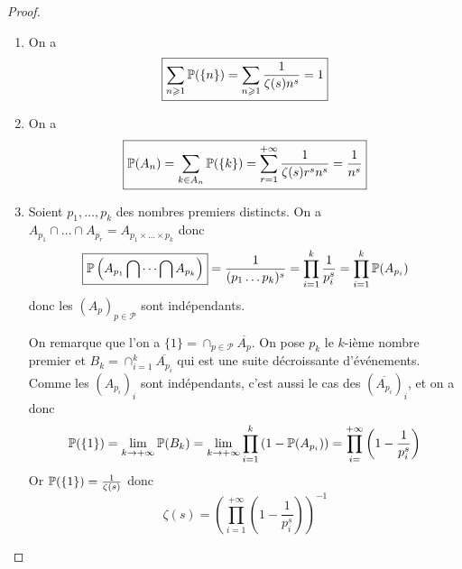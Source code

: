 \documentclass[12pt]{article}
\begin{document}
\begin{proof}
    \phantom{}
    \begin{enumerate}
        \item On a 
        \begin{equation}
            \boxed{\sum_{n\geqslant1}\P(\lbrace n\rbrace)=\sum_{n\geqslant1}\frac{1}{\zeta(s)n^{s}}=1}
        \end{equation}

        \item On a 
        \begin{equation}
            \boxed{\P(A_{n})=\sum_{k\in A_{n}}\P(\lbrace k\rbrace)=\sum_{r=1}^{+\infty}\frac{1}{\zeta(s)r^{s}n^{s}}=\frac{1}{n^{s}}}
        \end{equation}

        \item Soient $p_{1},\dots,p_{k}$ des nombres premiers distincts. On a $A_{p_{1}}\cap\dots\cap A_{p_{r}}=A_{p_{1}\times\dots\times p_{k}}$ donc 
        \begin{equation}
            \boxed{\P\left(A_{p_{1}}\bigcap\dots\bigcap A_{p_{k}}\right)}=\frac{1}{(p_{1}\dots p_{k})^{s}}=\prod_{i=1}^{k}\frac{1}{p_{i}^{s}}=\prod_{i=1}^{k}\P(A_{p_{i}})
        \end{equation}
        donc les $(A_{p})_{p\in\mathcal{P}}$ sont indépendants.

        On remarque que l'on a $\lbrace1\rbrace=\cap_{p\in\mathcal{P}}\overline{A_{p}}$. On pose $p_{k}$ le $k$-ième nombre premier et $B_{k}=\cap_{i=1}^{k}\overline{A_{p_{i}}}$ qui est une suite décroissante d'événements. Comme les $(A_{p_{i}})_{i}$ sont indépendants, c'est aussi le cas des $(\overline{A_{p_{i}}})_{i}$, et on a donc 
        \begin{equation}
            \P(\lbrace1\rbrace)=\lim\limits_{k\to+\infty}\P(B_{k})=\lim\limits_{k\to+\infty}\prod_{i=1}^{k}\left(1-\P(A_{p_{i}})\right)=\prod_{i=}^{+\infty}\left(1-\frac{1}{p_{i}^{s}}\right)
        \end{equation}
        Or $\P(\lbrace1\rbrace)=\frac{1}{\zeta(s)}$ donc 
        \begin{equation}
            \boxed{\zeta(s)=\left(\prod_{i=1}^{+\infty}\left(1-\frac{1}{p_{i}^{s}}\right)\right)^{-1}}
        \end{equation}
    \end{enumerate}
\end{proof}
\end{document}

